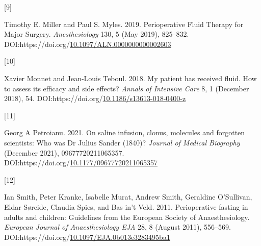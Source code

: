 \documentclass[a4paper, nobind]{templates/ociamthesis}
\newlength{\cslhangindent}
\newlength{\csllabelwidth}
\newenvironment{CSLReferences}[2] %
 {%
  \setlength{\parindent}{0pt}
  \ifodd #1
  \let\oldpar\par
  \def\par{\hangindent=\cslhangindent\oldpar}
  \fi
  \setlength{\parskip}{1mm}
  \setlength{\baselineskip}{6mm}
 }%
 {}
\newcommand{\CSLLeftMargin}[1]{\parbox[t]{\csllabelwidth}{#1}}
\newcommand{\CSLRightInline}[1]{\parbox[t]{\linewidth - \csllabelwidth}{#1}\break}
\begin{document}
\begin{CSLReferences}{0}{0}
\leavevmode{}%
\CSLLeftMargin{{[}9{]} }
\CSLRightInline{Timothy E. Miller and Paul S. Myles. 2019. Perioperative {Fluid Therapy} for {Major Surgery}. \emph{Anesthesiology} 130, 5 (May 2019), 825--832. DOI:https://doi.org/\href{https://doi.org/10.1097/ALN.0000000000002603}{10.1097/ALN.0000000000002603}}

\leavevmode{}%
\CSLLeftMargin{{[}10{]} }
\CSLRightInline{Xavier Monnet and Jean-Louis Teboul. 2018. My patient has received fluid. {How} to assess its efficacy and side effects? \emph{Annals of Intensive Care} 8, 1 (December 2018), 54. DOI:https://doi.org/\href{https://doi.org/10.1186/s13613-018-0400-z}{10.1186/s13613-018-0400-z}}

\leavevmode{}%
\CSLLeftMargin{{[}11{]} }
\CSLRightInline{Georg A Petroianu. 2021. On saline infusion, clonus, molecules and forgotten scientists: {Who} was {Dr Julius Sander} (1840\textendash 1909)? \emph{Journal of Medical Biography} (December 2021), 09677720211065357. DOI:https://doi.org/\href{https://doi.org/10.1177/09677720211065357}{10.1177/09677720211065357}}

\leavevmode{}%
\CSLLeftMargin{{[}12{]} }
\CSLRightInline{Ian Smith, Peter Kranke, Isabelle Murat, Andrew Smith, Geraldine O'Sullivan, Eldar Søreide, Claudia Spies, and Bas in't Veld. 2011. Perioperative fasting in adults and children: Guidelines from the {European Society} of {Anaesthesiology}. \emph{European Journal of Anaesthesiology \textbar{} EJA} 28, 8 (August 2011), 556--569. DOI:https://doi.org/\href{https://doi.org/10.1097/EJA.0b013e3283495ba1}{10.1097/EJA.0b013e3283495ba1}}

\end{CSLReferences}

\end{document}
